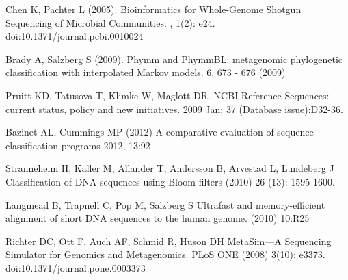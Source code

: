 \documentclass[12pt]{article} %
\begin{document}

\begin{thebibliography}{99} %
Chen K, Pachter L (2005). 
\newblock Bioinformatics for Whole-Genome Shotgun Sequencing of Microbial Communities. 
, 1(2): e24. doi:10.1371/journal.pcbi.0010024

Brady A, Salzberg S (2009).
\newblock Phymm and PhymmBL: metagenomic phylogenetic classification with interpolated Markov models.
 6, 673 - 676 (2009) 

Pruitt KD, Tatusova T, Klimke W, Maglott DR. 
\newblock NCBI Reference Sequences: current status, policy and new initiatives. 
 2009 Jan; 37 (Database issue):D32-36.

Bazinet AL, Cummings MP (2012)
\newblock A comparative evaluation of sequence classification programs
 2012, 13:92

Stranneheim H, Käller M,  Allander T,  Andersson B,  Arvestad L,  Lundeberg J 
\newblock Classification of DNA sequences using Bloom filters
 (2010) 26 (13): 1595-1600.

Langmead B,  Trapnell C,  Pop M,  Salzberg S
\newblock Ultrafast and memory-efficient alignment of short DNA sequences to the human genome.
 (2010) 10:R25

Richter DC, Ott F, Auch AF, Schmid R, Huson DH 
\newblock MetaSim—A Sequencing Simulator for Genomics and Metagenomics. 
\newblock PLoS ONE (2008) 3(10): e3373. doi:10.1371/journal.pone.0003373
\end{thebibliography}
\end{document}
